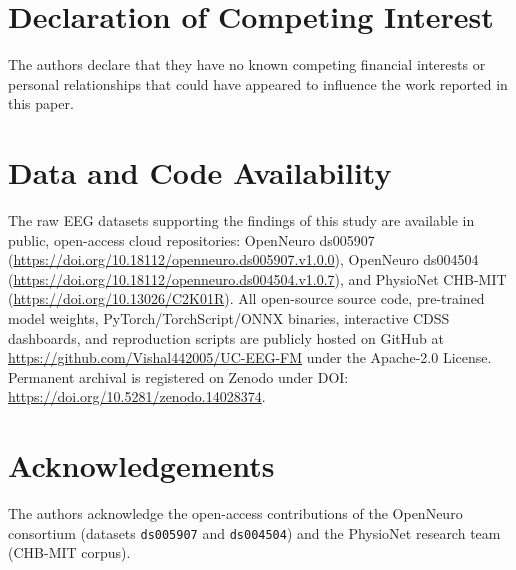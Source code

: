 \documentclass[11pt,a4paper]{article}
\begin{document}
\section*{Declaration of Competing Interest}
The authors declare that they have no known competing financial interests or personal relationships that could have appeared to influence the work reported in this paper.

\section*{Data and Code Availability}
The raw EEG datasets supporting the findings of this study are available in public, open-access cloud repositories: OpenNeuro ds005907 (\url{https://doi.org/10.18112/openneuro.ds005907.v1.0.0}), OpenNeuro ds004504 (\url{https://doi.org/10.18112/openneuro.ds004504.v1.0.7}), and PhysioNet CHB-MIT (\url{https://doi.org/10.13026/C2K01R}). All open-source source code, pre-trained model weights, PyTorch/TorchScript/ONNX binaries, interactive CDSS dashboards, and reproduction scripts are publicly hosted on GitHub at \url{https://github.com/Vishal442005/UC-EEG-FM} under the Apache-2.0 License. Permanent archival is registered on Zenodo under DOI: \url{https://doi.org/10.5281/zenodo.14028374}.

\section*{Acknowledgements}
The authors acknowledge the open-access contributions of the OpenNeuro consortium (datasets \texttt{ds005907} and \texttt{ds004504}) and the PhysioNet research team (CHB-MIT corpus).



\end{document}
